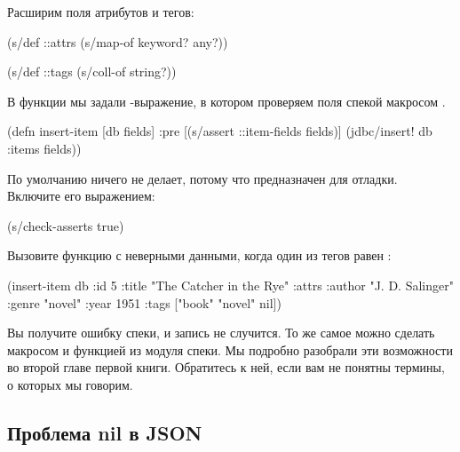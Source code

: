 Расширим поля атрибутов и тегов:

\begin{english}
  \begin{clojure}
(s/def ::attrs
  (s/map-of keyword? any?))

(s/def ::tags
  (s/coll-of string?))
  \end{clojure}
\end{english}

В функции  мы задали -выражение, в котором проверяем поля спекой макросом  .

\begin{english}
  \begin{clojure/lines}
(defn insert-item [db fields]
  {:pre [(s/assert ::item-fields fields)]}
  (jdbc/insert! db :items fields))
  \end{clojure/lines}
\end{english}

По умолчанию  ничего не делает, потому что предназначен для отладки. Включите его выражением:

\begin{english}
  \begin{clojure}
(s/check-asserts true)
  \end{clojure}
\end{english}

Вызовите функцию с неверными данными, когда один из тегов равен  :

\begin{english}
  \begin{clojure/lines}
(insert-item db {:id 5
                 :title "The Catcher in the Rye"
                 :attrs {:author "J. D. Salinger"
                         :genre "novel"
                         :year 1951}
                 :tags ["book" "novel" nil]})
  \end{clojure/lines}
\end{english}

Вы получите ошибку спеки, и запись не случится. То же самое можно сделать макросом  и функцией  из модуля спеки. Мы подробно разобрали эти возможности во второй главе первой книги. Обратитесь к ней, если вам не понятны термины, о которых мы говорим.

\subsection{Проблема nil в JSON}

